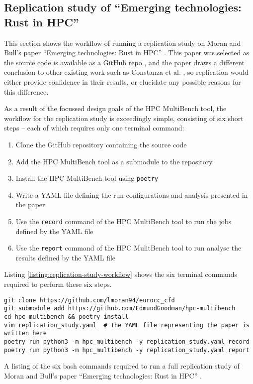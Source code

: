 \subsection{Replication study of ``Emerging technologies: Rust in HPC''}
\label{ssec:hpc-multibench-replication-study}

This section shows the workflow of running a replication study on Moran and Bull's paper ``Emerging technologies: Rust in HPC'' \cite{moranEmergingTechnologiesRust2023}. This paper was selected as the source code is available as a GitHub repo \cite{}, and the paper draws a different conclusion to other existing work such as Constanza et al. \cite{costanzoPerformanceVsProgramming2021}, so replication would either provide confidence in their results, or elucidate any possible reasons for this difference.

As a result of the focussed design goals of the HPC MultiBench tool, the workflow for the replication study is exceedingly simple, consisting of six short steps -- each of which requires only one terminal command:

\begin{enumerate}
    \item Clone the GitHub repository containing the source code
    \item Add the HPC MultiBench tool as a submodule to the repository
    \item Install the HPC MultiBench tool using \texttt{poetry}
    \item Write a YAML file defining the run configurations and analysis presented in the paper
    \item Use the \texttt{record} command of the HPC MultiBench tool to run the jobs defined by the YAML file
    \item Use the \texttt{report} command of the HPC MulitBench tool to run analyse the results defined by the YAML file
\end{enumerate}

Listing \ref{listing:replication-study-workflow} shows the six terminal commands required to perform these six steps.

\begin{listing}[H]
    \begin{verbatim}
git clone https://github.com/lmoran94/eurocc_cfd
git submodule add https://github.com/EdmundGoodman/hpc-multibench
cd hpc_multibench && poetry install
vim replication_study.yaml  # The YAML file representing the paper is written here
poetry run python3 -m hpc_multibench -y replication_study.yaml record
poetry run python3 -m hpc_multibench -y replication_study.yaml report
    \end{verbatim}
    \caption{A listing of the six bash commands required to run a full replication study of Moran and Bull's paper ``Emerging technologies: Rust in HPC'' \cite{moranEmergingTechnologiesRust2023}.}
    \label{listing:replication-study-workflow}
\end{listing}

